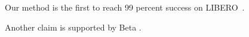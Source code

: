 \documentclass{article}
\begin{document}
\newcommand{\libero}{LIBERO~\cite{ka}}

Our method is the first to reach 99 percent success on \libero.

Another claim is supported by Beta \cite{kb}.


\end{document}
